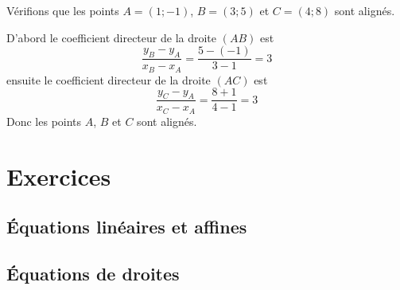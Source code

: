\begin{example}
    Vérifions que les points \( A=(1;-1)\), \( B=(3;5)\) et \( C=(4;8)\) sont alignés.

    D'abord le coefficient directeur de la droite \( (AB)\) est 
    \begin{equation}
        \frac{ y_B-y_A }{ x_B-x_A }=\frac{ 5-(-1) }{ 3-1 }=3
    \end{equation}
    ensuite le coefficient directeur de la droite \( (AC)\) est
    \begin{equation}
        \frac{ y_C-y_A }{ x_C-x_A }=\frac{ 8+1 }{ 4-1 }=3
    \end{equation}
    Donc les points \( A\), \( B\) et \( C\) sont alignés.
\end{example}

\section{Exercices}

\subsection{Équations linéaires et affines}


\subsection{Équations de droites}



